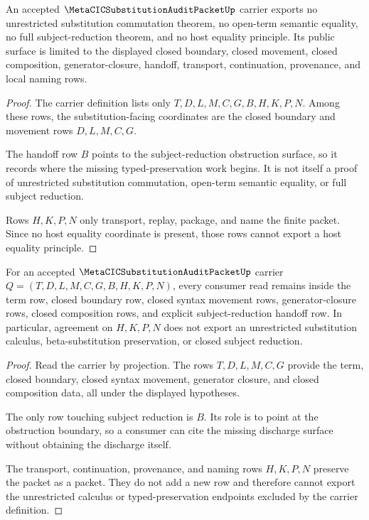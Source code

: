\begin{theorem}
\label{thm:metacic-substitution-audit-packet-nonescape}
An accepted $\MetaCICSubstitutionAuditPacketUp$ carrier exports no unrestricted substitution commutation theorem, no open-term semantic equality, no full subject-reduction theorem, and no host equality principle. Its public surface is limited to the displayed closed boundary, closed movement, closed composition, generator-closure, handoff, transport, continuation, provenance, and local naming rows.
\end{theorem}
\begin{proof}
The carrier definition lists only $T,D,L,M,C,G,B,H,K,P,N$. Among these rows, the substitution-facing coordinates are the closed boundary and movement rows $D,L,M,C,G$.

The handoff row $B$ points to the subject-reduction obstruction surface, so it records where the missing typed-preservation work begins. It is not itself a proof of unrestricted substitution commutation, open-term semantic equality, or full subject reduction.

Rows $H,K,P,N$ only transport, replay, package, and name the finite packet. Since no host equality coordinate is present, those rows cannot export a host equality principle.
\end{proof}

\begin{theorem}
\label{thm:metacic-substitution-audit-packet-boundary-nonescape}
For an accepted $\MetaCICSubstitutionAuditPacketUp$ carrier $Q=(T,D,L,M,C,G,B,H,K,P,N)$, every consumer read remains inside the term row, closed boundary row, closed syntax movement rows, generator-closure rows, closed composition rows, and explicit subject-reduction handoff row. In particular, agreement on $H,K,P,N$ does not export an unrestricted substitution calculus, beta-substitution preservation, or closed subject reduction.
\end{theorem}
\begin{proof}
Read the carrier by projection. The rows $T,D,L,M,C,G$ provide the term, closed boundary, closed syntax movement, generator closure, and closed composition data, all under the displayed hypotheses.

The only row touching subject reduction is $B$. Its role is to point at the obstruction boundary, so a consumer can cite the missing discharge surface without obtaining the discharge itself.

The transport, continuation, provenance, and naming rows $H,K,P,N$ preserve the packet as a packet. They do not add a new row and therefore cannot export the unrestricted calculus or typed-preservation endpoints excluded by the carrier definition.
\end{proof}

